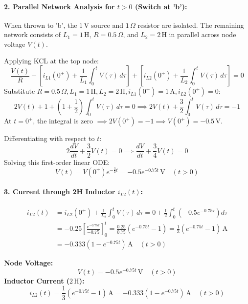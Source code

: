 \documentclass[11pt,a4paper,oneside]{article}
\begin{document}
\paragraph{2. Parallel Network Analysis for $t > 0$ (Switch at 'b'):}
When thrown to 'b', the $1\,\mathrm{V}$ source and $1\,\Omega$ resistor are isolated. The remaining network consists of $L_1 = 1\,\mathrm{H}$, $R = 0.5\,\Omega$, and $L_2 = 2\,\mathrm{H}$ in parallel across node voltage $V(t)$.

Applying KCL at the top node:
\begin{equation}
  \frac{V(t)}{R} + \left[i_{L1}(0^+) + \frac{1}{L_1}\int_0^t V(\tau)\,d\tau\right] + \left[i_{L2}(0^+) + \frac{1}{L_2}\int_0^t V(\tau)\,d\tau\right] = 0
\end{equation}
Substitute $R = 0.5\,\Omega, L_1 = 1\,\mathrm{H}, L_2 = 2\,\mathrm{H}, i_{L1}(0^+) = 1\,\mathrm{A}, i_{L2}(0^+) = 0$:
\[
2V(t) + 1 + \left(1 + \frac{1}{2}\right)\int_0^t V(\tau)\,d\tau = 0 \implies 2V(t) + \frac{3}{2}\int_0^t V(\tau)\,d\tau = -1
\]
At $t = 0^+$, the integral is zero $\implies 2V(0^+) = -1 \implies V(0^+) = -0.5\,\mathrm{V}$.

Differentiating with respect to $t$:
\begin{equation}
  2 \frac{dV}{dt} + \frac{3}{2} V(t) = 0 \implies \frac{dV}{dt} + \frac{3}{4} V(t) = 0
\end{equation}
Solving this first-order linear ODE:
\begin{equation}
  V(t) = V(0^+) e^{-\frac{3}{4}t} = -0.5 e^{-0.75t}\,\mathrm{V} \quad (t > 0)
\end{equation}

\paragraph{3. Current through 2H Inductor $i_{L2}(t)$:}
\begin{align}
  i_{L2}(t) &= i_{L2}(0^+) + \frac{1}{L_2}\int_0^t V(\tau)\,d\tau = 0 + \frac{1}{2}\int_0^t \left(-0.5 e^{-0.75\tau}\right)d\tau \nonumber \\
  &= -0.25 \left[\frac{e^{-0.75\tau}}{-0.75}\right]_0^t = \frac{0.25}{0.75}\left(e^{-0.75t} - 1\right) = \frac{1}{3}\left(e^{-0.75t} - 1\right)\,\mathrm{A} \nonumber \\
  &= -0.333\left(1 - e^{-0.75t}\right)\,\mathrm{A} \quad (t > 0)
\end{align}

\begin{answerbox}
\textbf{Node Voltage:}
\[
V(t) = -0.5 e^{-0.75t}\,\mathrm{V} \quad (t > 0)
\]
\textbf{Inductor Current ($2\,\mathrm{H}$):}
\[
i_{L2}(t) = \frac{1}{3}\left(e^{-0.75t} - 1\right)\,\mathrm{A} = -0.333\left(1 - e^{-0.75t}\right)\,\mathrm{A} \quad (t > 0)
\]
\end{answerbox}
\end{document}
